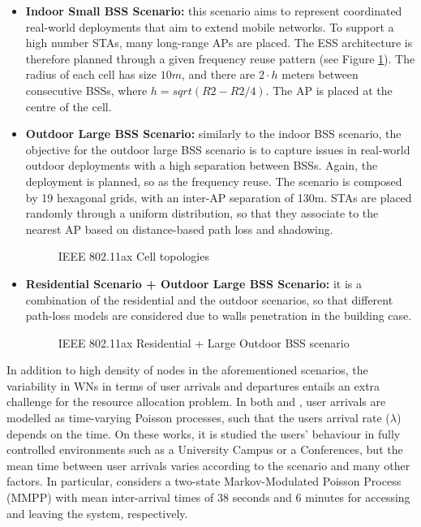 \documentclass[12pt, a4paper,twoside]{tesi_upf}
\begin{document}
\begin{itemize}
			\item \textbf{Indoor Small BSS  Scenario:} this scenario aims to represent coordinated real-world deployments that aim to extend mobile networks. To support a high number STAs, many long-range APs are placed. The ESS architecture is therefore planned through a given frequency reuse pattern (see Figure \ref{fig:large_ax}). The radius of each cell has size $10 m$, and there are $2 \cdot h$ meters between consecutive BSSs, where $h=sqrt(R2-R2/4)$. The AP is placed at the centre of the cell.			

			\item \textbf{Outdoor Large BSS Scenario:} similarly to the indoor BSS scenario, the objective for the outdoor large BSS scenario is to capture issues in real-world outdoor deployments with a high separation between BSSs. Again, the deployment is planned, so as the frequency reuse. The scenario is composed by 19 hexagonal grids, with an inter-AP separation of 130m. STAs are placed randomly through a uniform distribution, so that they associate to the nearest AP based on distance-based path loss and shadowing.  
			\begin{figure}[h!]
				\centering
				\caption{IEEE 802.11ax Cell topologies}
				\label{fig:large_ax}
			\end{figure}	
		
			\item \textbf{Residential Scenario + Outdoor Large BSS Scenario:} it is a combination of the residential and the outdoor scenarios, so that different path-loss models are considered due to walls penetration in the building case.
			\begin{figure}[h!]
				\centering
				\caption{IEEE 802.11ax Residential + Large Outdoor BSS scenario}
				\label{fig:residential_large_ax}
			\end{figure}	
		\end{itemize}	
	
		In addition to high density of nodes in the aforementioned scenarios, the variability in WNs in terms of user arrivals and departures entails an extra challenge for the resource allocation problem. In both \cite{balachandran2002characterizing} and \cite{papadopouli2005modeling}, user arrivals are modelled as time-varying Poisson processes, such that the users arrival rate ($\lambda$) depends on the time. On these works, it is studied the users' behaviour in fully controlled environments such as a University Campus or a Conferences, but the mean time between user arrivals varies according to the scenario and many other factors. In particular, \cite{papadopouli2005modeling} considers a two-state Markov-Modulated Poisson Process (MMPP) with mean inter-arrival times of 38 seconds and 6 minutes for accessing and leaving the system, respectively. %
			
\end{document}
